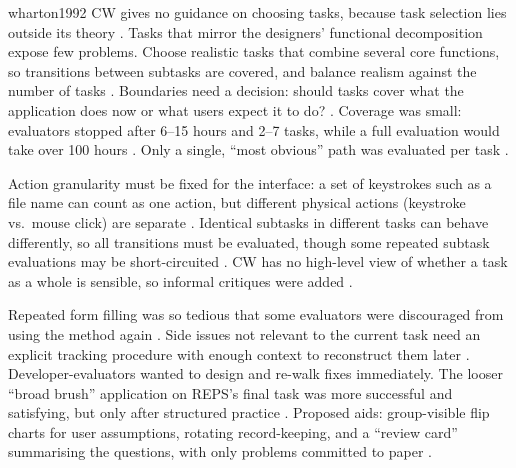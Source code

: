 \begin{papercard}{wharton1992}
 CW gives no guidance on choosing tasks, because task selection lies outside its theory . Tasks that mirror the designers' functional decomposition expose few problems. Choose realistic tasks that combine several core functions, so transitions between subtasks are covered, and balance realism against the number of tasks . Boundaries need a decision: should tasks cover what the application does now or what users expect it to do? . Coverage was small: evaluators stopped after 6--15 hours and 2--7 tasks, while a full evaluation would take over 100 hours . Only a single, ``most obvious'' path was evaluated per task .

 Action granularity must be fixed for the interface: a set of keystrokes such as a file name can count as one action, but different physical actions (keystroke vs.\ mouse click) are separate . Identical subtasks in different tasks can behave differently, so all transitions must be evaluated, though some repeated subtask evaluations may be short-circuited . CW has no high-level view of whether a task as a whole is sensible, so informal critiques were added .

 Repeated form filling was so tedious that some evaluators were discouraged from using the method again . Side issues not relevant to the current task need an explicit tracking procedure with enough context to reconstruct them later . Developer-evaluators wanted to design and re-walk fixes immediately. The looser ``broad brush'' application on REPS's final task was more successful and satisfying, but only after structured practice . Proposed aids: group-visible flip charts for user assumptions, rotating record-keeping, and a ``review card'' summarising the questions, with only problems committed to paper .


\end{papercard}
